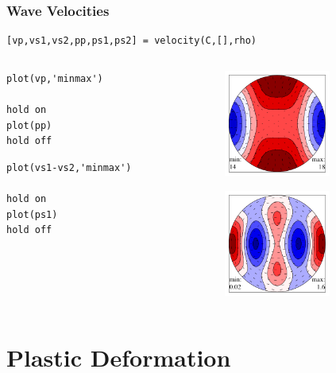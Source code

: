 \documentclass[compress]{beamer}
\begin{document}
\begin{frame}[fragile]
  \frametitle{Wave Velocities}

\begin{lstlisting}[style=input]
[vp,vs1,vs2,pp,ps1,ps2] = velocity(C,[],rho)
\end{lstlisting}

  \begin{columns}
  \begin{column}{8.5cm}

\begin{lstlisting}[style=input]
plot(vp,'minmax')

hold on
plot(pp)
hold off
\end{lstlisting}

\bigskip
\pause

    \begin{lstlisting}[style=input]
plot(vs1-vs2,'minmax')

hold on
plot(ps1)
hold off
\end{lstlisting}

  \end{column}
    \begin{column}{3.5cm}
      \includegraphics[width=3.5cm]{pic/vp-pp}

      \includegraphics[width=3.5cm]{pic/vs12-ps1}
  \end{column}

  \end{columns}

\end{frame}

\section{Plastic Deformation}
\label{sec:plastic-deformation}
\end{document}
